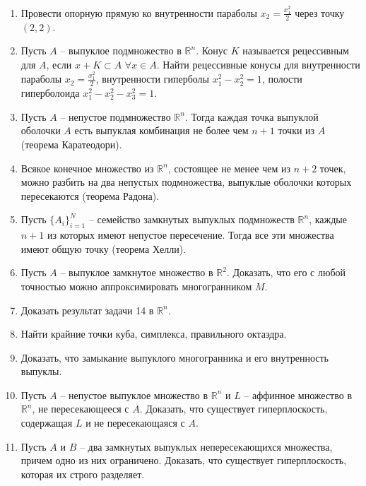 \begin{enumerate}
		\item Провести опорную прямую ко внутренности параболы $x_2 = \frac{x_1^2}{2}$ через точку $(2,2)$.

		\item Пусть $A$ -- выпуклое подмножество в $\mathbb{R}^n$. Конус $K$ называется рецессивным для $A$, если $x + K \subset A$ $\forall x \in A$. Найти рецессивные конусы для внутренности параболы $x_2 = \frac{x_1^2}{2}$, внутренности гиперболы $x_1^2 - x_2^2 = 1$, полости гиперболоида $x_1^2 - x_2^2 - x_3^2 = 1$.

		\item Пусть $A$ -- непустое подмножество $\mathbb{R}^n$. Тогда каждая точка выпуклой оболочки $A$ есть выпуклая комбинация не более чем $n+1$ точки из $A$ (теорема Каратеодори).

		\item Всякое конечное множество из $\mathbb{R}^n$, состоящее не менее чем из $n+2$ точек, можно разбить на два непустых подмножества, выпуклые оболочки которых пересекаются (теорема Радона).

		\item Пусть $\{A_i\}_{i=1}^N$ -- семейство замкнутых выпуклых подмножеств $\mathbb{R}^n$, каждые $n+1$ из которых имеют непустое пересечение. Тогда все эти множества имеют общую точку (теорема Хелли).

		\item Пусть $A$ -- выпуклое замкнутое множество в $\mathbb{R}^2$. Доказать, что его с любой точностью можно аппроксимировать многогранником $M$.

		\item Доказать результат задачи 14 в $\mathbb{R}^n$.

		\item Найти крайние точки куба, симплекса, правильного октаэдра.

		\item Доказать, что замыкание выпуклого многогранника и его внутренность выпуклы.

		\item Пусть $A$ -- непустое выпуклое множество в $\mathbb{R}^n$ и $L$ -- аффинное множество в $\mathbb{R}^n$, не пересекающееся с $A$. Доказать, что существует гиперплоскость, содержащая $L$ и не пересекающаяся с $A$.

		\item Пусть $A$ и $B$ -- два замкнутых выпуклых непересекающихся множества, причем одно из них ограничено. Доказать, что существует гиперплоскость, которая их строго разделяет.


\end{enumerate}

